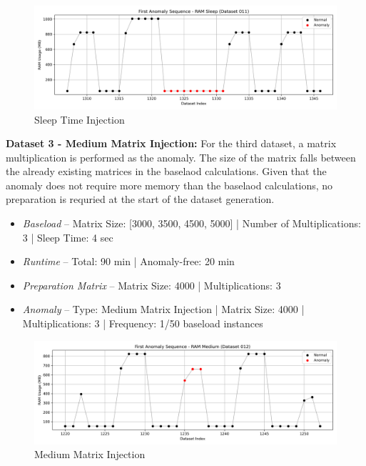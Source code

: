 \documentclass[12pt,oneside]{article}
\begin{document}
\begin{figure}[H] %
    \centering %
    \includegraphics[width=\textwidth]{anomaly_sequence_11}
    \caption{Sleep Time Injection}
    \label{fig:anomaly_11} %
\end{figure}

\textbf{Dataset 3 - Medium Matrix Injection:} For the third dataset, a matrix multiplication is performed as the anomaly. The size of the matrix falls between the already existing matrices in the baselaod calculations. Given that the anomaly does not require more memory than the baselaod calculations, no preparation is requried at the start of the dataset generation.
\begin{itemize}
    \item \textit{Baseload} -- Matrix Size: [3000, 3500, 4500, 5000] | Number of Multiplications: 3 | Sleep Time: 4 sec
    \item \textit{Runtime} -- Total: 90 min | Anomaly-free: 20 min 
    \item \textit{Preparation Matrix} -- Matrix Size: 4000 | Multiplications: 3
    \item \textit{Anomaly} -- Type: Medium Matrix Injection | Matrix Size: 4000 | Multiplications: 3 | Frequency: 1/50 baseload instances
\end{itemize}

\begin{figure}[H] %
    \centering %
    \includegraphics[width=\textwidth]{anomaly_sequence_12}
    \caption{Medium Matrix Injection}
    \label{fig:anomaly_12} %
\end{figure}
\end{document}
